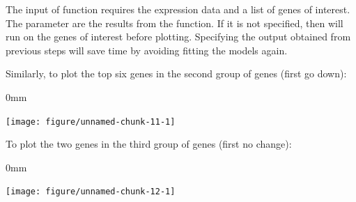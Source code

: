 \documentclass{article}\usepackage[]{graphicx}\usepackage[usenames,dvipsnames]{color}
\newcommand{\hlnum}[1]{\textcolor[rgb]{0.816,0.125,0.439}{#1}}%
\newcommand{\hlopt}[1]{\textcolor[rgb]{0,0,0}{#1}}%
\newcommand{\hlstd}[1]{\textcolor[rgb]{0.251,0.251,0.251}{#1}}%
\newcommand{\hlkwb}[1]{\textcolor[rgb]{0,0,0}{#1}}%
\newcommand{\hlkwc}[1]{\textcolor[rgb]{0.251,0.251,0.251}{#1}}%
\newcommand{\hlkwd}[1]{\textcolor[rgb]{0.878,0.439,0.125}{#1}}%
\newenvironment{knitrout}{}{} %
\begin{document}
The input of function  requires the expression data and a list of genes of interest.
The parameter  are the results from the  function.
If it is not specified, then  will run  on the genes of interest before plotting.
Specifying the output obtained from previous steps will save time by avoiding fitting the models again.

Similarly, to plot the top six genes in the second group of genes (first go down):

\begin{knitrout}
\color{fgcolor}\begin{adjustwidth}{\fltoffset}{0mm}

{\centering \texttt{[image: figure/unnamed-chunk-11-1]} 

}

\end{adjustwidth}
\end{knitrout}

To plot the two genes in the third group of genes (first no change):
\begin{knitrout}
\color{fgcolor}\begin{adjustwidth}{\fltoffset}{0mm}

{\centering \texttt{[image: figure/unnamed-chunk-12-1]} 

}

\end{adjustwidth}
\end{knitrout}
\end{document}
